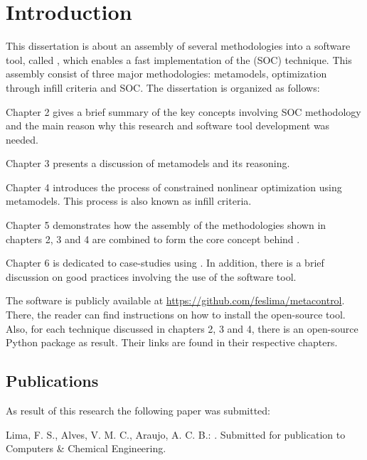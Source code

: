 \documentclass[../msc-thesis.tex]{subfiles}
\begin{document}
\chapter{Introduction}

This dissertation is about an assembly of several methodologies into a software 
tool, called \mtc, which enables a fast implementation of the \soc (SOC) 
technique. This assembly consist of three major methodologies: \kriging 
metamodels, optimization through infill criteria and SOC. The dissertation is 
organized as follows:

Chapter 2 gives a brief summary of the key concepts involving SOC methodology 
and the main reason why this research and software tool development was 
needed.

Chapter 3 presents a discussion of \kriging metamodels and its reasoning.

Chapter 4 introduces the process of constrained nonlinear optimization using 
\kriging metamodels. This process is also known as infill criteria.

Chapter 5 demonstrates how the assembly of the methodologies shown in chapters 
2, 3 and 4 are combined to form the core concept behind \mtc.

Chapter 6 is dedicated to case-studies using \mtc. In addition, there is a 
brief discussion on good practices involving the use of the software tool.

The \mtc software is publicly available at 
\url{https://github.com/feslima/metacontrol}. There, the reader can find 
instructions on how to install the open-source tool. Also, for each technique 
discussed in chapters 2, 3 and 4, there is an open-source Python package as 
result. Their links are found in their respective chapters.

\section{Publications}

As result of this research the following paper was submitted:

Lima, F. S., Alves, V. M. C., Araujo, A. C. B.: \imprimirtitulo. Submitted 
for publication to Computers \& Chemical Engineering.
\end{document}
